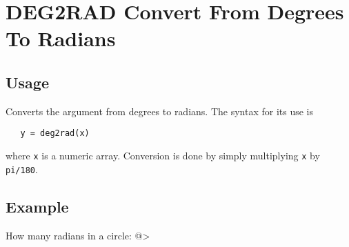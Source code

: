 \section{DEG2RAD Convert From Degrees To Radians}

\subsection{Usage}

Converts the argument from degrees to radians.  The
syntax for its use is
\begin{verbatim}
   y = deg2rad(x)
\end{verbatim}
where \verb|x| is a numeric array.  Conversion is done by
simply multiplying \verb|x| by \verb|pi/180|.
\subsection{Example}

How many radians in a circle:
@>
